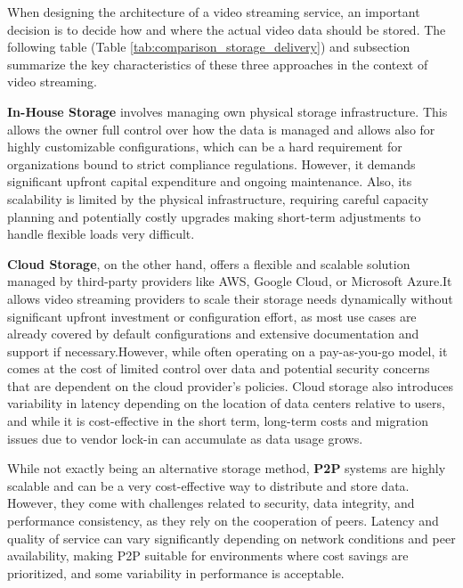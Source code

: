 When designing the architecture of a video streaming service, an important decision is to decide how and where the actual video data should be stored. The following table (Table \ref{tab:comparison_storage_delivery}) and subsection summarize the key characteristics of these three approaches in the context of video streaming. 

\textbf{In-House Storage} involves managing own physical storage infrastructure. This allows the owner full control over how the data is managed and allows also for highly customizable configurations, which can be a hard requirement for organizations bound to strict compliance regulations. However, it demands significant upfront capital expenditure and ongoing maintenance. Also, its scalability is limited by the physical infrastructure, requiring careful capacity planning and potentially costly upgrades making short-term adjustments to handle flexible loads very difficult. 

\textbf{Cloud Storage}, on the other hand, offers a flexible and scalable solution managed by third-party providers like AWS, Google Cloud, or Microsoft Azure.It allows video streaming providers to scale their storage needs dynamically without significant upfront investment or configuration effort, as most use cases are already covered by default configurations and extensive documentation and support if necessary.However, while often operating on a pay-as-you-go model, it comes at the cost of limited control over data and potential security concerns that are dependent on the cloud provider's policies. Cloud storage also introduces variability in latency depending on the location of data centers relative to users, and while it is cost-effective in the short term, long-term costs and migration issues due to vendor lock-in can accumulate as data usage grows.

While not exactly being an alternative storage method, \textbf{\ac{P2P}} systems are highly scalable and can be a very cost-effective way to distribute and store data. However, they come with challenges related to security, data integrity, and performance consistency, as they rely on the cooperation of peers. Latency and quality of service can vary significantly depending on network conditions and peer availability, making \ac{P2P} suitable for environments where cost savings are prioritized, and some variability in performance is acceptable.



